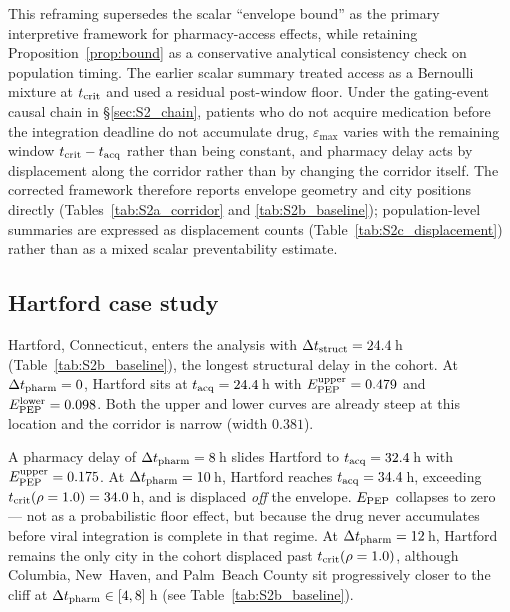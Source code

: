 \documentclass[11pt]{article}
\theoremstyle{definition}
\theoremstyle{remark}
\begin{document}
This reframing supersedes the scalar ``envelope bound'' as the primary
interpretive framework for pharmacy-access effects, while retaining
Proposition~\ref{prop:bound} as a conservative analytical consistency
check on population timing.  The earlier scalar summary treated access
as a Bernoulli mixture at $t_{\rm crit}$ and used a residual post-window
floor.  Under the gating-event causal chain in \S\ref{sec:S2_chain},
patients who do not acquire medication before the integration deadline
do not accumulate drug, $\varepsilon_{\max}$ varies with the remaining
window $t_{\rm crit} - t_{\rm acq}$ rather than being constant, and
pharmacy delay acts by displacement along the corridor rather than by
changing the corridor itself.  The corrected framework therefore reports
envelope geometry and city positions directly
(Tables~\ref{tab:S2a_corridor} and \ref{tab:S2b_baseline});
population-level summaries are expressed as displacement counts
(Table~\ref{tab:S2c_displacement}) rather than as a mixed scalar
preventability estimate.



\subsection{Hartford case study}
\label{sec:S2_hartford}

Hartford, Connecticut, enters the analysis with
$\Delta t_{\rm struct} = 24.4$\,h (Table~\ref{tab:S2b_baseline}), the
longest structural delay in the cohort.  At $\Delta t_{\rm pharm} = 0$,
Hartford sits at $t_{\rm acq} = 24.4$\,h with
$E_{\rm PEP}^{\rm upper} = 0.479$ and $E_{\rm PEP}^{\rm lower} = 0.098$.
Both the upper and lower curves are already steep at this location and
the corridor is narrow (width $0.381$).

A pharmacy delay of $\Delta t_{\rm pharm} = 8$\,h slides Hartford to
$t_{\rm acq} = 32.4$\,h with $E_{\rm PEP}^{\rm upper} = 0.175$.  At
$\Delta t_{\rm pharm} = 10$\,h, Hartford reaches $t_{\rm acq} = 34.4$\,h,
exceeding $t_{\rm crit}(\rho=1.0) = 34.0$\,h, and is displaced
\emph{off} the envelope.  $E_{\rm PEP}$ collapses to zero --- not as a
probabilistic floor effect, but because the drug never accumulates before
viral integration is complete in that regime.  At
$\Delta t_{\rm pharm} = 12$\,h, Hartford remains the only city in the
cohort displaced past $t_{\rm crit}(\rho=1.0)$, although Columbia,
New~Haven, and Palm~Beach County sit progressively closer to the cliff
at $\Delta t_{\rm pharm} \in [4, 8]$\,h
(see Table~\ref{tab:S2b_baseline}).
\end{document}
